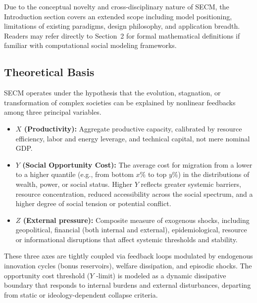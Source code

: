 \documentclass[12pt]{report}
\begin{document}
Due to the conceptual novelty and cross-disciplinary nature of SECM, the Introduction section covers an extended scope including model positioning, limitations of existing paradigms, design philosophy, and application breadth. Readers may refer directly to Section~2 for formal mathematical definitions if familiar with computational social modeling frameworks.

\subsection{Theoretical Basis}
SECM operates under the hypothesis that the evolution, stagnation, or transformation of complex societies can be explained by nonlinear feedbacks among three principal variables.
\begin{itemize}
  \item \textbf{$X$ (Productivity):} Aggregate productive capacity, calibrated by resource efficiency, labor and energy leverage, and technical capital, not mere nominal GDP.
  \item \textbf{$Y$ (Social Opportunity Cost):} The average cost for migration from a lower to a higher quantile (e.g., from bottom $x\%$ to top $y\%$) in the distributions of wealth, power, or social status. Higher $Y$ reflects greater systemic barriers, resource concentration, reduced accessibility across the social spectrum, and a higher degree of social tension or potential conflict.
  \item \textbf{$Z$ (External pressure):} Composite measure of exogenous shocks, including geopolitical, financial (both internal and external), epidemiological, resource or informational disruptions that affect systemic thresholds and stability.
\end{itemize}
These three axes are tightly coupled via feedback loops modulated by endogenous innovation cycles (bonus reservoirs), welfare dissipation, and episodic shocks. The opportunity cost threshold ($Y$ -limit) is modeled as a dynamic dissipative boundary that responds to internal burdens and external disturbances, departing from static or ideology-dependent collapse criteria.
\end{document}

